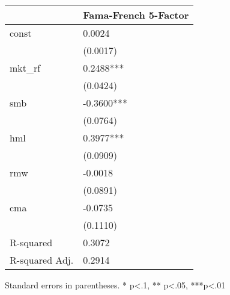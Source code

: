 \begin{table}
\caption{}
\label{}
\begin{center}
\begin{tabular}{ll}
\hline
               & Fama-French 5-Factor  \\
\hline
const          & 0.0024                \\
               & (0.0017)              \\
mkt\_rf        & 0.2488***             \\
               & (0.0424)              \\
smb            & -0.3600***            \\
               & (0.0764)              \\
hml            & 0.3977***             \\
               & (0.0909)              \\
rmw            & -0.0018               \\
               & (0.0891)              \\
cma            & -0.0735               \\
               & (0.1110)              \\
R-squared      & 0.3072                \\
R-squared Adj. & 0.2914                \\
\hline
\end{tabular}
\end{center}
\end{table}
\bigskip
Standard errors in parentheses. \newline 
* p<.1, ** p<.05, ***p<.01